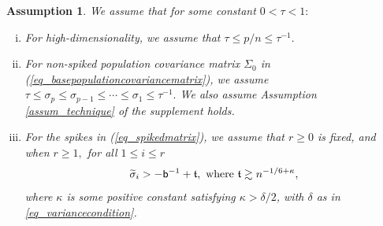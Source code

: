 \documentclass[12pt]{article}
\theoremstyle{plain}
\newtheorem{assumption}{Assumption}[section]
\numberwithin{equation}{section}
\begin{document}
\begin{assumption}\label{assu_modelassumption}
	We assume that for some constant $0<\tau<1:$
	\begin{enumerate}[(i)]
		\item For high-dimensionality, we assume that $\tau \leq p/n \leq \tau^{-1}.$
		\item For non-spiked population covariance matrix $\Sigma_0$ in (\ref{eq_basepopulationcovariancematrix}), we assume  $\tau \leq \sigma_p \leq \sigma_{p-1} \leq \cdots \leq \sigma_1 \leq \tau^{-1}. $ We also assume Assumption \ref{assum_technique} of the supplement holds. 
		\item For the spikes in (\ref{eq_spikedmatrix}), we assume that $r \geq 0$ is fixed, and when $r \geq 1,$ for all $1 \leq i \leq r$ \vspace*{-10pt}
		\begin{equation}\label{eq_spiketruedefinition}
			\vspace*{-10pt}
			\widetilde{\sigma}_i>-\mathsf{b}^{-1}+\mathfrak{t}, \ \text{where} \ \mathfrak{t} \gtrsim n^{-1/6+\kappa}, 
		\end{equation}
		where $\kappa$ is some positive constant satisfying $\kappa>\delta/2$, with $\delta$ as in \eqref{eq_variancecondition}.
	\end{enumerate}
\end{assumption}
\end{document}
